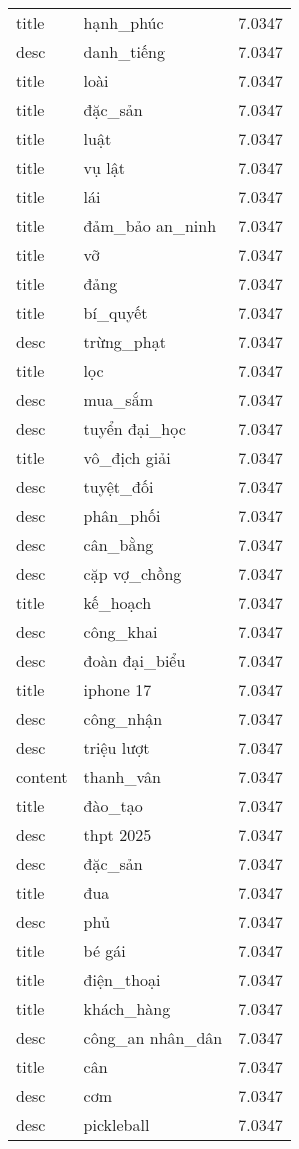 \documentclass{article}
\begin{document}
\begin{tabular}{lll}
title & hạnh\_phúc & 7.0347\\
desc & danh\_tiếng & 7.0347\\
title & loài & 7.0347\\
title & đặc\_sản & 7.0347\\
title & luật & 7.0347\\
title & vụ lật & 7.0347\\
title & lái & 7.0347\\
title & đảm\_bảo an\_ninh & 7.0347\\
title & vỡ & 7.0347\\
title & đảng & 7.0347\\
title & bí\_quyết & 7.0347\\
desc & trừng\_phạt & 7.0347\\
title & lọc & 7.0347\\
desc & mua\_sắm & 7.0347\\
desc & tuyển đại\_học & 7.0347\\
title & vô\_địch giải & 7.0347\\
desc & tuyệt\_đối & 7.0347\\
desc & phân\_phối & 7.0347\\
desc & cân\_bằng & 7.0347\\
desc & cặp vợ\_chồng & 7.0347\\
title & kế\_hoạch & 7.0347\\
desc & công\_khai & 7.0347\\
desc & đoàn đại\_biểu & 7.0347\\
title & iphone 17 & 7.0347\\
desc & công\_nhận & 7.0347\\
desc & triệu lượt & 7.0347\\
content & thanh\_vân & 7.0347\\
title & đào\_tạo & 7.0347\\
desc & thpt 2025 & 7.0347\\
desc & đặc\_sản & 7.0347\\
title & đua & 7.0347\\
desc & phủ & 7.0347\\
title & bé gái & 7.0347\\
title & điện\_thoại & 7.0347\\
title & khách\_hàng & 7.0347\\
desc & công\_an nhân\_dân & 7.0347\\
title & cân & 7.0347\\
desc & cơm & 7.0347\\
desc & pickleball & 7.0347\\

\end{tabular}
\end{document}
